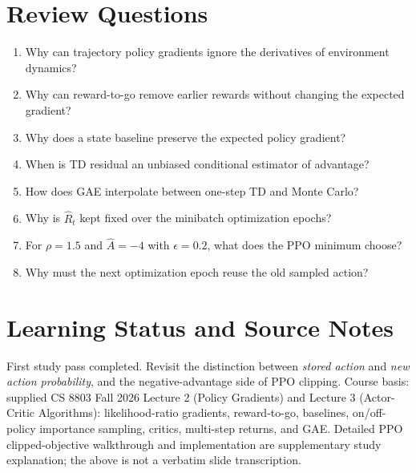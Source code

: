 \section{Review Questions}
\begin{enumerate}
\item Why can trajectory policy gradients ignore the derivatives of environment dynamics?
\item Why can reward-to-go remove earlier rewards without changing the expected gradient?
\item Why does a state baseline preserve the expected policy gradient?
\item When is TD residual an unbiased conditional estimator of advantage?
\item How does GAE interpolate between one-step TD and Monte Carlo?
\item Why is $\hat R_t$ kept fixed over the minibatch optimization epochs?
\item For $\rho=1.5$ and $\hat A=-4$ with $\epsilon=0.2$, what does the PPO minimum choose?
\item Why must the next optimization epoch reuse the old sampled action?
\end{enumerate}
\section{Learning Status and Source Notes}
First study pass completed. Revisit the distinction between \emph{stored action} and \emph{new action probability}, and the negative-advantage side of PPO clipping.
Course basis: supplied CS 8803 Fall 2026 Lecture 2 (Policy Gradients) and Lecture 3 (Actor-Critic Algorithms): likelihood-ratio gradients, reward-to-go, baselines, on/off-policy importance sampling, critics, multi-step returns, and GAE. Detailed PPO clipped-objective walkthrough and implementation are supplementary study explanation; the above is not a verbatim slide transcription.
